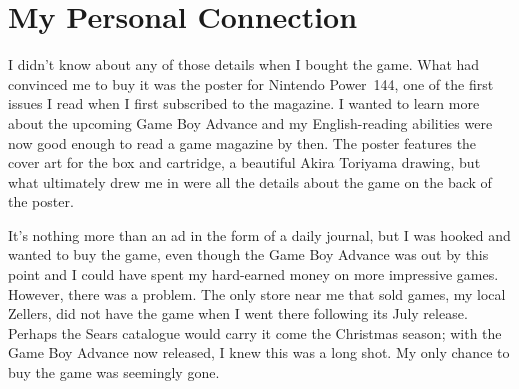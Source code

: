 \documentclass{book}
\begin{document}
\FloatBarrier\section*{My Personal Connection}
I didn’t know about any of those details when I bought the game. What had convinced me to buy it was the poster for Nintendo Power~144, one of the first issues I read when I first subscribed to the magazine. I wanted to learn more about the upcoming Game Boy Advance and my English-reading abilities were now good enough to read a game magazine by then. The poster features the cover art for the box and cartridge, a beautiful Akira Toriyama drawing, but what ultimately drew me in were all the details about the game on the back of the poster.\par
\FloatBarrier\vspace{\baselineskip}\centering
\begin{minipage}{0.45\linewidth}\end{minipage}\vspace{2pt}
\begin{minipage}{0.45\linewidth}\end{minipage}\vspace{2pt}
\begin{minipage}{0.45\linewidth}\end{minipage}\vspace{2pt}
\begin{minipage}{0.45\linewidth}\end{minipage}
\par\justifying
It’s nothing more than an ad in the form of a daily journal, but I was hooked and wanted to buy the game, even though the Game Boy Advance was out by this point and I could have spent my hard-earned money on more impressive games. However, there was a problem. The only store near me that sold games, my local Zellers, did not have the game when I went there following its July release. Perhaps the Sears catalogue would carry it come the Christmas season; with the Game Boy Advance now released, I knew this was a long shot. My only chance to buy the game was seemingly gone.\par
\end{document}
